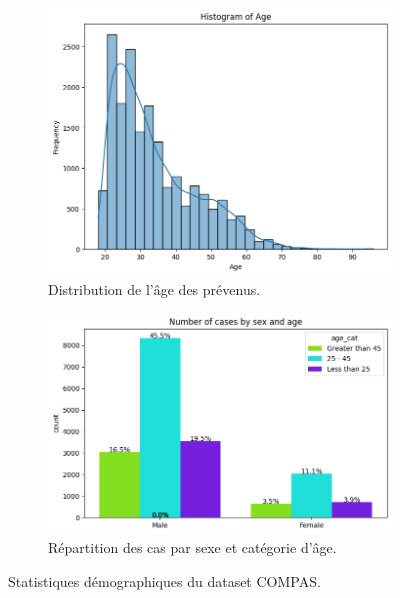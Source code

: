 \documentclass{article}
\begin{document}
\begin{figure}[h!]
    \centering
    \begin{subfigure}[b]{0.48\textwidth}
        \centering
        \includegraphics[width=\textwidth]{plot_age.png}
        \caption{Distribution de l'âge des prévenus.}
        \label{fig:age_distribution}
    \end{subfigure}
    \hfill
    \begin{subfigure}[b]{0.48\textwidth}
        \centering
        \includegraphics[width=\textwidth]{plot_sexe.png}
        \caption{Répartition des cas par sexe et catégorie d'âge.}
        \label{fig:sex_age_distribution}
    \end{subfigure}
    \caption{Statistiques démographiques du dataset COMPAS.}
\end{figure}
\end{document}

